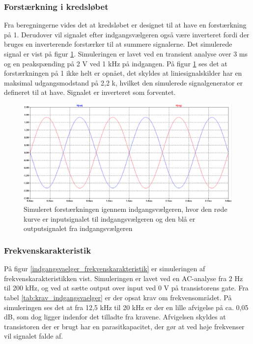 \subsubsection*{Forstærkning i kredsløbet}
Fra beregningerne vides det at kredsløbet er designet til at have en forstærkning på 1. Derudover vil signalet efter indgangsvælgeren også være inverteret fordi der bruges en inverterende forstærker til at summere signalerne. Det simulerede signal er vist på figur \ref{indgangsvaelger_input/output}. Simuleringen er lavet ved en transient analyse over 3 ms og en peakspænding på 2 V ved 1 kHz på indgangen. På figur \ref{indgangsvaelger_input/output} ses det at forstærkningen på 1 ikke helt er opnået, det skyldes at liniesignalskilder har en maksimal udgangsmodstand på 2,2 k\ohm, hvilket den simulerede signalgenerator er defineret til at have. Signalet er inverteret som forventet. 
\begin{figure}[h]
\centering
\includegraphics[width=\textwidth]{teknisk/indgangsvaelger/simulering/input_output.png}
\caption{Simuleret forstærkningen igennem indgangsvælgeren, hvor den røde kurve er inputsignalet til indgangsvælgeren og den blå er outputsignalet fra indgangsvælgeren}
\label{indgangsvaelger_input/output}
\end{figure}

\subsubsection*{Frekvenskarakteristik}
På figur \ref{indgangsvaelger_frekvenskarakteristik} er simuleringen af frekvenskarakteristikken vist. Simuleringen er lavet ved en AC-analyse fra 2 Hz til 200 kHz, og ved at sætte output over input ved 0 V på transistorens gate. Fra tabel \ref{tab:krav_indgangsvaelger} er der opsat krav om frekvensområdet. På simuleringen ses det at fra 12,5 kHz til 20 kHz er der en lille afvigelse på ca. 0,05 dB, som dog ligger indenfor det tilladte fra kravene. Afvigelsen skyldes at transistoren der er brugt har en parasitkapacitet, der gør at ved høje frekvenser vil signalet falde af.  

